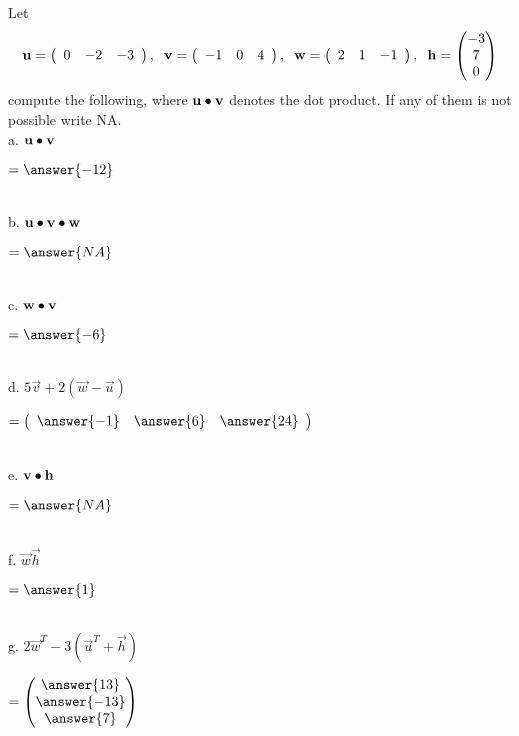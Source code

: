 \documentclass{ximera}
\author{Parisa Fatheddin}
\begin{document}
\begin{exercise}


Let
\begin{equation*}
\vec{u} = \left(\begin{array}{ccc}
0 & -2& -3
\end{array}\right), \hspace{.2cm} \vec{v} = \left(\begin{array}{ccc} -1 & 0 & 4\end{array}\right), \hspace{.2cm} \vec{w} = \left(\begin{array}{ccc} 2 & 1 & -1 \end{array}\right), \hspace{.2cm} \vec{h} = \begin{pmatrix} -3\\
7\\
0
\end{pmatrix}
\end{equation*}
compute the following, where $\vec{u}\dotp \vec{v}$ denotes the dot product. If any of them is not possible write NA. \\

a. $\vec{u}\dotp \vec{v}$ \begin{prompt}$= \answer{-12}$\end{prompt}\\

b. $\vec{u}\dotp \vec{v} \dotp\vec{w} $\begin{prompt} $= \answer{NA}$\end{prompt}\\

c. $\vec{w}\dotp \vec{v} $\begin{prompt} $=\answer{-6}$\end{prompt}\\

d. $5 \vec{v} + 2\left(\vec{w}-\vec{u}\right)$ \begin{prompt} $= \left(\begin{array}{ccc} \answer{-1} & \answer{6} & \answer{24}
\end{array}\right)$ \end{prompt}\\

e. $\vec{v} \dotp \vec{h}$ \begin{prompt}$= \answer{NA}$\end{prompt}\\

f. $\vec{w}\vec{h}$ \begin{prompt} $= \answer{1}$\end{prompt}\\

g. $2 \vec{w}^{T} - 3\left(\vec{u}^{T} + \vec{h}\right)$\begin{prompt}$= \begin{pmatrix} \answer{13} \\
\answer{-13}\\
\answer{7}
\end{pmatrix}$\end{prompt}
\end{exercise}
\end{document}
